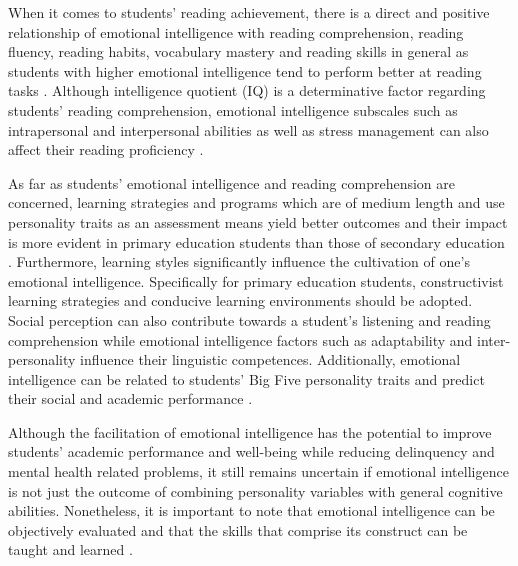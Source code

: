 \documentclass[english]{textolivre}
\begin{document}
When it comes to students’ reading achievement, there is a direct and positive relationship of emotional intelligence with reading comprehension, reading fluency, reading habits, vocabulary mastery and reading skills in general as students with higher emotional intelligence tend to perform better at reading tasks \cite{resmisari_correlation_2022}. Although intelligence quotient (IQ) is a determinative factor regarding students’ reading comprehension, emotional intelligence subscales such as intrapersonal and interpersonal abilities as well as stress management can also affect their reading proficiency \cite{ghabanchi2014correlation}.

As far as students’ emotional intelligence and reading comprehension are concerned, learning strategies and programs which are of medium length and use personality traits as an assessment means yield better outcomes and their impact is more evident in primary education students than those of secondary education \cite{puertas_molero_inteligencia_2019}. Furthermore, learning styles significantly influence the cultivation of one’s emotional intelligence. Specifically for primary education students, constructivist learning strategies and conducive learning environments should be adopted. Social perception can also contribute towards a student’s listening and reading comprehension \cite{froiland_emotional_2020} while emotional intelligence factors such as adaptability and inter-personality influence their linguistic competences. Additionally, emotional intelligence can be related to students’ Big Five personality traits and predict their social and academic performance \cite{perpina_marti_does_2020}.

Although the facilitation of emotional intelligence has the potential to improve students’ academic performance and well-being while reducing delinquency and mental health related problems, it still remains uncertain if emotional intelligence is not just the outcome of combining personality variables with general cognitive abilities. Nonetheless, it is important to note that emotional intelligence can be objectively evaluated and that the skills that comprise its construct can be taught and learned \cite{brackett_emotional_2011}.
\end{document}
